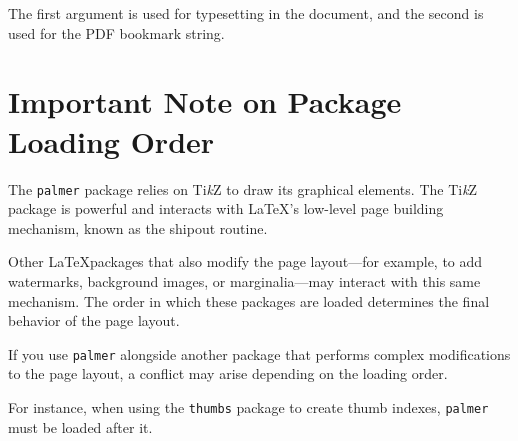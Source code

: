 \documentclass[12pt]{ltjsarticle}
\begin{document}
The first argument is used for typesetting in the document, and the second is used for the PDF bookmark string.


 \section{Important Note on Package Loading Order}

 The \texttt{palmer} package relies on Ti\textit{k}Z to draw its graphical elements. The Ti\textit{k}Z package is powerful and interacts with \LaTeX's low-level page building mechanism, known as the shipout routine.

Other \LaTeX packages that also modify the page layout—for example, to add watermarks, background images, or marginalia—may interact with this same mechanism. The order in which these packages are loaded determines the final behavior of the page layout.

If you use \texttt{palmer} alongside another package that performs complex modifications to the page layout, a conflict may arise depending on the loading order.

For instance, when using the \texttt{thumbs} package to create thumb indexes, \texttt{palmer} must be loaded after it. 
\end{document}
